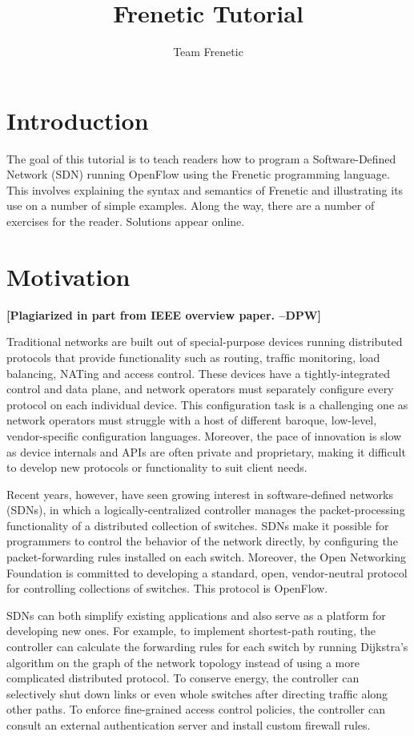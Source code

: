 \documentclass{article}
\title{Frenetic Tutorial}
\author{Team Frenetic}
\newcommand{\finish}[2][cornellred]{\ifdraft\textcolor{#1}{\textbf{[#2]}}\fi}
\newcommand{\dpw}[1]{\finish[cornellred]{#1 --DPW}}
\begin{document}
\maketitle

\section{Introduction}

The goal of this tutorial is to teach readers how to program a
Software-Defined Network (SDN) running OpenFlow using the Frenetic
programming language.  This involves explaining the syntax and
semantics of Frenetic and illustrating its use on a number of simple
examples.  Along the way, there are a number of exercises for the
reader.  Solutions appear online.

\section{Motivation}

\dpw{Plagiarized in part from IEEE overview paper.}

Traditional networks are built out of special-purpose devices running
distributed protocols that provide functionality such as routing,
trafﬁc monitoring, load balancing, NATing and access control. These
devices have a tightly-integrated control and data plane, and network
operators must separately conﬁgure every protocol on each individual
device. This configuration task is a challenging one as network
operators must struggle with a host of different baroque, low-level,
vendor-specific configuration languages.  Moreover, the pace of
innovation is slow as device internals and APIs are often private and
proprietary, making it difficult to develop new protocols or
functionality to suit client needs.

Recent years, however, have seen growing interest in software-deﬁned
networks (SDNs), in which a logically-centralized controller manages
the packet-processing functionality of a distributed collection of
switches. SDNs make it possible for programmers to control the
behavior of the network directly, by conﬁguring the packet-forwarding
rules installed on each switch.  Moreover, the Open Networking
Foundation is committed to developing a standard, open, vendor-neutral
protocol for controlling collections of switches.  This protocol is
OpenFlow.

SDNs can both simplify existing applications and also serve as a
platform for developing new ones. For example, to implement
shortest-path routing, the controller can calculate the forwarding
rules for each switch by running Dijkstra’s algorithm on the graph of
the network topology instead of using a more complicated distributed
protocol. To conserve energy, the controller can selectively shut down
links or even whole switches after directing trafﬁc along other
paths. To enforce ﬁne-grained access control policies, the controller
can consult an external authentication server and install custom
firewall rules.
\end{document}

